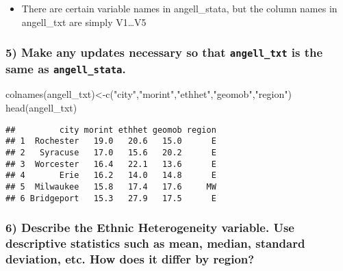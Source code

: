 \documentclass[
  12pt,
]{article}
\newenvironment{Shaded}{\begin{snugshade}}{\end{snugshade}}
\newcommand{\FunctionTok}[1]{\textcolor[rgb]{0.00,0.00,0.00}{#1}}
\newcommand{\NormalTok}[1]{#1}
\newcommand{\OtherTok}[1]{\textcolor[rgb]{0.56,0.35,0.01}{#1}}
\newcommand{\StringTok}[1]{\textcolor[rgb]{0.31,0.60,0.02}{#1}}
\providecommand{\tightlist}{%
  \setlength{\itemsep}{0pt}\setlength{\parskip}{0pt}}
\begin{document}
\begin{itemize}
\tightlist
\item
  There are certain variable names in angell\_stata, but the column
  names in angell\_txt are simply V1\ldots V5
\end{itemize}

\hypertarget{make-any-updates-necessary-so-that-angell_txt-is-the-same-as-angell_stata.}{%
\subsubsection{\texorpdfstring{5) Make any updates necessary so that
\texttt{angell\_txt} is the same as
\texttt{angell\_stata}.}{5) Make any updates necessary so that angell\_txt is the same as angell\_stata.}}\label{make-any-updates-necessary-so-that-angell_txt-is-the-same-as-angell_stata.}}

\begin{Shaded}
\begin{Highlighting}[]
\FunctionTok{colnames}\NormalTok{(angell\_txt)}\OtherTok{\textless{}{-}}\FunctionTok{c}\NormalTok{(}\StringTok{"city"}\NormalTok{,}\StringTok{"morint"}\NormalTok{,}\StringTok{"ethhet"}\NormalTok{,}\StringTok{"geomob"}\NormalTok{,}\StringTok{"region"}\NormalTok{)}
\FunctionTok{head}\NormalTok{(angell\_txt)}
\end{Highlighting}
\end{Shaded}

\begin{verbatim}
##         city morint ethhet geomob region
## 1  Rochester   19.0   20.6   15.0      E
## 2   Syracuse   17.0   15.6   20.2      E
## 3  Worcester   16.4   22.1   13.6      E
## 4       Erie   16.2   14.0   14.8      E
## 5  Milwaukee   15.8   17.4   17.6     MW
## 6 Bridgeport   15.3   27.9   17.5      E
\end{verbatim}

\hypertarget{describe-the-ethnic-heterogeneity-variable.-use-descriptive-statistics-such-as-mean-median-standard-deviation-etc.-how-does-it-differ-by-region}{%
\subsubsection{6) Describe the Ethnic Heterogeneity variable. Use
descriptive statistics such as mean, median, standard deviation, etc.
How does it differ by
region?}\label{describe-the-ethnic-heterogeneity-variable.-use-descriptive-statistics-such-as-mean-median-standard-deviation-etc.-how-does-it-differ-by-region}}
\end{document}
